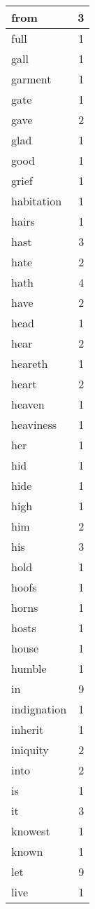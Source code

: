 \begin{center}
\begin{longtable}{l|r}
from & 3\\ \hline 
full & 1\\ \hline 
gall & 1\\ \hline 
garment & 1\\ \hline 
gate & 1\\ \hline 
gave & 2\\ \hline 
glad & 1\\ \hline 
good & 1\\ \hline 
grief & 1\\ \hline 
habitation & 1\\ \hline 
hairs & 1\\ \hline 
hast & 3\\ \hline 
hate & 2\\ \hline 
hath & 4\\ \hline 
have & 2\\ \hline 
head & 1\\ \hline 
hear & 2\\ \hline 
heareth & 1\\ \hline 
heart & 2\\ \hline 
heaven & 1\\ \hline 
heaviness & 1\\ \hline 
her & 1\\ \hline 
hid & 1\\ \hline 
hide & 1\\ \hline 
high & 1\\ \hline 
him & 2\\ \hline 
his & 3\\ \hline 
hold & 1\\ \hline 
hoofs & 1\\ \hline 
horns & 1\\ \hline 
hosts & 1\\ \hline 
house & 1\\ \hline 
humble & 1\\ \hline 
in & 9\\ \hline 
indignation & 1\\ \hline 
inherit & 1\\ \hline 
iniquity & 2\\ \hline 
into & 2\\ \hline 
is & 1\\ \hline 
it & 3\\ \hline 
knowest & 1\\ \hline 
known & 1\\ \hline 
let & 9\\ \hline 
live & 1\\ \hline 

\end{longtable}
\end{center}
